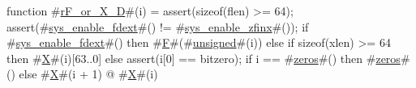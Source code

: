 function #\hyperref[sailRISCVzrFzyorzyXzyD]{rF\_or\_X\_D}#(i) = {
  assert(sizeof(flen) >= 64);
  assert(#\hyperref[sailRISCVzsyszyenablezyfdext]{sys\_enable\_fdext}#() != #\hyperref[sailRISCVzsyszyenablezyzzfinx]{sys\_enable\_zfinx}#());
  if   #\hyperref[sailRISCVzsyszyenablezyfdext]{sys\_enable\_fdext}#()
  then #\hyperref[sailRISCVzF]{F}#(#\hyperref[sailRISCVzunsigned]{unsigned}#(i))
  else if sizeof(xlen) >= 64
  then #\hyperref[sailRISCVzX]{X}#(i)[63..0]
  else {
    assert(i[0] == bitzero);
    if i == #\hyperref[sailRISCVzzzeros]{zeros}#() then #\hyperref[sailRISCVzzzeros]{zeros}#() else #\hyperref[sailRISCVzX]{X}#(i + 1) @ #\hyperref[sailRISCVzX]{X}#(i)
  }
}

